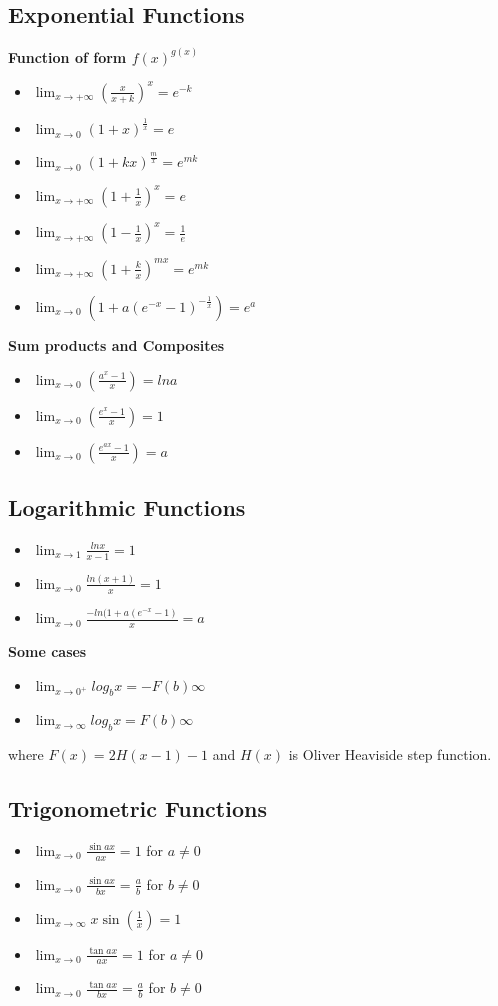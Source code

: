 \documentclass[12pt]{article}
\begin{document}
\subsection{Exponential Functions}
\textbf{Function of form $f(x)^{g(x)}$}
\begin{itemize}
\item $\lim_{x \to + \infty} (\frac{x}{x+k})^x=e^{-k}$
\item $\lim_{x \to 0} (1+x)^\frac{1}{x}=e$
\item $\lim_{x \to 0} (1+kx)^\frac{m}{x}=e^{mk}$
\item $\lim_{x \to + \infty} (1+ \frac{1}{x})^x=e$
\item $\lim_{x \to + \infty} (1- \frac{1}{x})^x=\frac{1}{e}$
\item $\lim_{x \to + \infty} (1+ \frac{k}{x})^{mx}=e^{mk}$
\item $\lim_{x \to 0} (1+ a(e^{-x}-1)^{- \frac{1}{x}})=e^a$
\end{itemize}
\textbf{Sum products and Composites}
\begin{itemize}
\item $\lim_{x \to 0} (\frac{a^x -1}{x})=lna$
\item $\lim_{x \to 0} (\frac{e^x -1}{x})=1$
\item $\lim_{x \to 0} (\frac{e^{ax}-1}{x})=a$
\end{itemize}
\subsection{Logarithmic Functions}
\begin{itemize}
\item $\lim_{x \to 1} \frac{lnx}{x-1}=1$
\item $\lim_{x \to 0} \frac{ln(x+1)}{x}=1$
\item $\lim_{x \to 0} \frac{-ln(1+a(e^{-x}-1)}{x}=a$
\end{itemize}
\textbf{Some cases}
\begin{itemize}
\item $\lim_{x \to 0^+} log_b x=-F(b) \infty$
\item $\lim_{x \to \infty} log_b x=F(b) \infty$
\end{itemize}
where $F(x)=2H(x-1)-1$ and $H(x)$ is Oliver Heaviside step function.
\subsection{Trigonometric Functions}
\begin{itemize}
\item $\lim_{x \to 0} \frac{ \sin ax}{ax}=1 $ for $a \not= 0$
\item $\lim_{x \to 0} \frac{\sin ax}{bx}=\frac{a}{b} $ for $b \not= 0$
\item $\lim_{x \to \infty} x \sin( \frac{1}{x})=1$
\item $\lim_{x \to 0} \frac{\tan ax}{ax}=1 $ for $a \not= 0$ 
\item $\lim_{x \to 0} \frac{\tan ax}{bx}=\frac{a}{b} $ for $b \not= 0$
\end{itemize}
\end{document}
